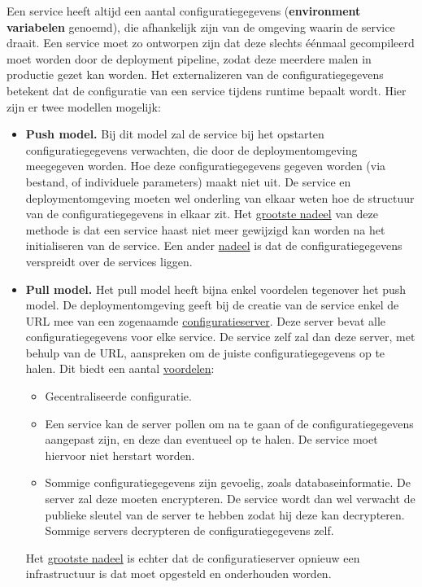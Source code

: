 \documentclass{report}
\begin{document}
	Een service heeft altijd een aantal configuratiegegevens (\textbf{environment variabelen} genoemd), die afhankelijk zijn van de omgeving waarin de service draait. Een service moet zo ontworpen zijn dat deze slechts éénmaal gecompileerd moet worden door de deployment pipeline, zodat deze meerdere malen in productie gezet kan worden. Het externalizeren van de configuratiegegevens betekent dat de configuratie van een service tijdens runtime bepaalt wordt. Hier zijn er twee modellen mogelijk:
	\begin{itemize}
		\item \textbf{Push model.} Bij dit model zal de service bij het opstarten configuratiegegevens verwachten, die door de deploymentomgeving meegegeven worden. Hoe deze configuratiegegevens gegeven worden (via bestand, of individuele parameters) maakt niet uit. De service en deploymentomgeving moeten wel onderling van elkaar weten hoe de structuur van de configuratiegegevens in elkaar zit. Het \underline{grootste nadeel} van deze methode is dat een service haast niet meer gewijzigd kan worden na het initialiseren van de service. Een ander \underline{nadeel} is dat de configuratiegegevens verspreidt over de services liggen.
		\item \textbf{Pull model.} Het pull model heeft bijna enkel voordelen tegenover het push model. De deploymentomgeving geeft bij de creatie van de service enkel de URL mee van een zogenaamde \underline{configuratieserver}. Deze server bevat alle configuratiegegevens voor elke service. De service zelf zal dan deze server, met behulp van de URL, aanspreken om de juiste configuratiegegevens op te halen. Dit biedt een aantal \underline{voordelen}:
		\begin{itemize}
			\item Gecentraliseerde configuratie.
			\item Een service kan de server pollen om na te gaan of de configuratiegegevens aangepast zijn, en deze dan eventueel op te halen. De service moet hiervoor niet herstart worden.
			\item Sommige configuratiegegevens zijn gevoelig, zoals databaseinformatie. De server zal deze moeten encrypteren. De service wordt dan wel verwacht de publieke sleutel van de server te hebben zodat hij deze kan decrypteren. Sommige servers decrypteren de configuratiegegevens zelf.
		\end{itemize}
		Het \underline{grootste nadeel} is echter dat de configuratieserver opnieuw een infrastructuur is dat moet opgesteld en onderhouden worden.
	\end{itemize}
\end{document}
